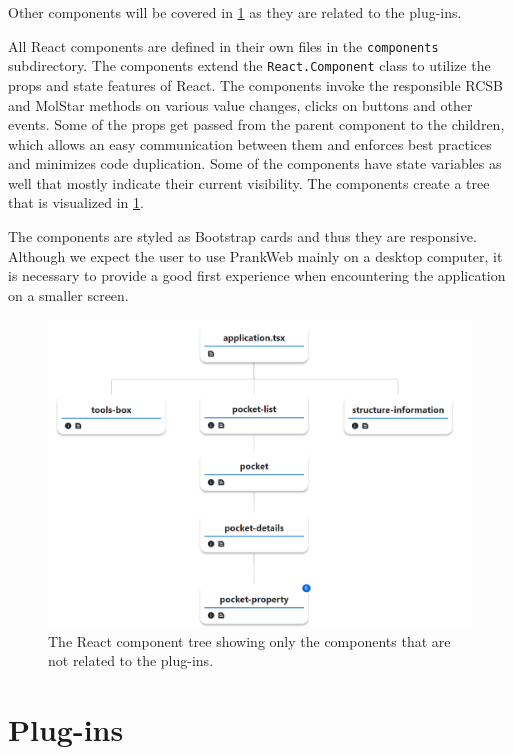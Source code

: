 Other components will be covered in \cref{sec:plugins} as they are related to the plug-ins.

All React components are defined in their own files in the \texttt{components} subdirectory. The components extend the \texttt{React.Component} class to utilize the props and state features of React. The components invoke the responsible RCSB and MolStar methods on various value changes, clicks on buttons and other events. Some of the props get passed from the parent component to the children, which allows an easy communication between them and enforces best practices and minimizes code duplication. Some of the components have state variables as well that mostly indicate their current visibility. The components create a tree that is visualized in \cref{fig:react-molstar}.

The components are styled as Bootstrap cards and thus they are responsive. Although we expect the user to use PrankWeb mainly on a desktop computer, it is necessary to provide a good first experience when encountering the application on a smaller screen.



\begin{figure}[htb]
    \centering
    \includegraphics[width=\textwidth]{img/react_molstar.pdf}
    \caption{The React component tree showing only the components that are not related to the plug-ins.}
    \label{fig:react-molstar}
\end{figure}

\section{Plug-ins}
\label{sec:plugins}


